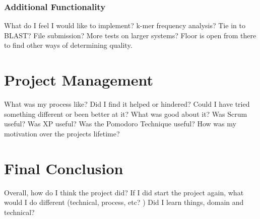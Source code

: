 \subsubsection{Additional Functionality}
What do I feel I would like to implement? k-mer frequency analysis? Tie in to BLAST? File submission? More tests on larger systems? Floor is open from there to find other ways of determining quality.

\section{Project Management}
What was my process like? Did I find it helped or hindered? Could I have tried something different or been better at it? What was good about it? Was Scrum useful? Was XP useful? Was the Pomodoro Technique useful? How was my motivation over the projects lifetime?

\section{Final Conclusion}
Overall, how do I think the project did?
If I did start the project again, what would I do different (technical, process, etc? )
Did I learn things, domain and technical?





